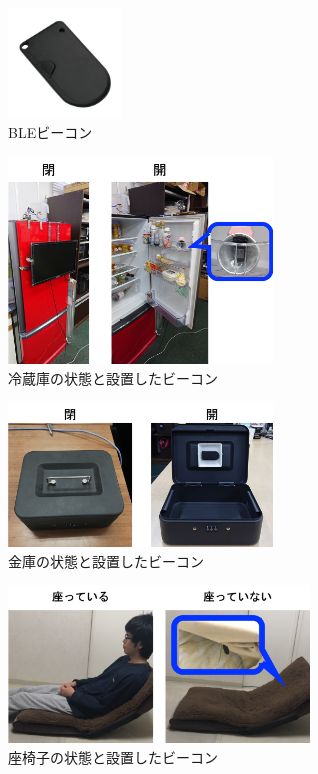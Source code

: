 \documentclass[Japanese]{dicomopapers}
\begin{document}
\begin{figure}[t]
    \centering
    \includegraphics[width=3cm]{ble.png}
    \caption{BLEビーコン}
    \label{beacon}
   \end{figure}
\begin{figure}[t]
    \centering
    \includegraphics[width=7cm]{regisW2.png}
    \caption{冷蔵庫の状態と設置したビーコン}
    \label{freezer}
\end{figure}
\begin{figure}[t]
    \centering
    \includegraphics[width=7cm]{kinkoW.png}
    \caption{金庫の状態と設置したビーコン}
    \label{safe}
\end{figure}
\begin{figure}[t]
    \centering
    \includegraphics[width=8cm]{zaisuW.png}
    \caption{座椅子の状態と設置したビーコン}
    \label{chair}
\end{figure}
\end{document}
